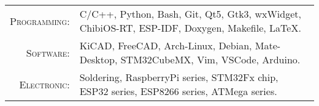 %
%



\renewcommand{\arraystretch}{1.1}

	\begin{tabular}{>{}r>{}p{13cm}}
		\textsc{Programming:} &  C/C++, Python, Bash, Git, Qt5, Gtk3, wxWidget, ChibiOS-RT, ESP-IDF, Doxygen, Makefile, \LaTeX.\\
		\textsc{Software:}    &  KiCAD, FreeCAD, Arch-Linux, Debian, Mate-Desktop, STM32CubeMX, Vim, VSCode, Arduino.\\
		\textsc{Electronic:}  &  Soldering, RaspberryPi series, STM32Fx chip, ESP32 series, ESP8266 series, ATMega series.\\
	\end{tabular}
